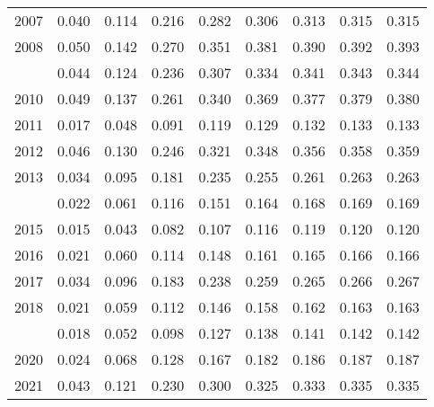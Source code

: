 \documentclass[
]{article}
\begin{document}
\begin{longtable}[t]{lrrrrrrrr}
2007 & 0.040 & 0.114 & 0.216 & 0.282 & 0.306 & 0.313 & 0.315 & 0.315\\
2008 & 0.050 & 0.142 & 0.270 & 0.351 & 0.381 & 0.390 & 0.392 & 0.393\\
\addlinespace
2009 & 0.044 & 0.124 & 0.236 & 0.307 & 0.334 & 0.341 & 0.343 & 0.344\\
2010 & 0.049 & 0.137 & 0.261 & 0.340 & 0.369 & 0.377 & 0.379 & 0.380\\
2011 & 0.017 & 0.048 & 0.091 & 0.119 & 0.129 & 0.132 & 0.133 & 0.133\\
2012 & 0.046 & 0.130 & 0.246 & 0.321 & 0.348 & 0.356 & 0.358 & 0.359\\
2013 & 0.034 & 0.095 & 0.181 & 0.235 & 0.255 & 0.261 & 0.263 & 0.263\\
\addlinespace
2014 & 0.022 & 0.061 & 0.116 & 0.151 & 0.164 & 0.168 & 0.169 & 0.169\\
2015 & 0.015 & 0.043 & 0.082 & 0.107 & 0.116 & 0.119 & 0.120 & 0.120\\
2016 & 0.021 & 0.060 & 0.114 & 0.148 & 0.161 & 0.165 & 0.166 & 0.166\\
2017 & 0.034 & 0.096 & 0.183 & 0.238 & 0.259 & 0.265 & 0.266 & 0.267\\
2018 & 0.021 & 0.059 & 0.112 & 0.146 & 0.158 & 0.162 & 0.163 & 0.163\\
\addlinespace
2019 & 0.018 & 0.052 & 0.098 & 0.127 & 0.138 & 0.141 & 0.142 & 0.142\\
2020 & 0.024 & 0.068 & 0.128 & 0.167 & 0.182 & 0.186 & 0.187 & 0.187\\
2021 & 0.043 & 0.121 & 0.230 & 0.300 & 0.325 & 0.333 & 0.335 & 0.335\\*
\end{longtable}
\end{document}
